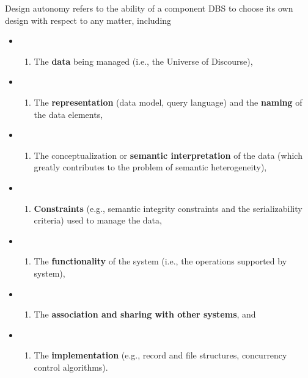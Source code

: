 \begin{leftbar}
Design autonomy refers to the ability of a component DBS to choose its
own design with respect to any matter, including

\begin{itemize}
\item
  \begin{enumerate}
  \def\labelenumi{(\alph{enumi})}
  
  \item
    The \textbf{data} being managed (i.e., the Universe of Discourse),
  \end{enumerate}
\item
  \begin{enumerate}
  \def\labelenumi{(\alph{enumi})}
  \setcounter{enumi}{1}
  
  \item
    The \textbf{representation} (data model, query language) and the
    \textbf{naming} of the data elements,
  \end{enumerate}
\item
  \begin{enumerate}
  \def\labelenumi{(\alph{enumi})}
  \setcounter{enumi}{2}
  
  \item
    The conceptualization or \textbf{semantic interpretation} of the
    data (which greatly contributes to the problem of semantic
    heterogeneity),
  \end{enumerate}
\item
  \begin{enumerate}
  \def\labelenumi{(\alph{enumi})}
  \setcounter{enumi}{3}
  
  \item
    \textbf{Constraints} (e.g., semantic integrity constraints and the
    serializability criteria) used to manage the data,
  \end{enumerate}
\item
  \begin{enumerate}
  \def\labelenumi{(\alph{enumi})}
  \setcounter{enumi}{4}
  
  \item
    The \textbf{functionality} of the system (i.e., the operations
    supported by system),
  \end{enumerate}
\item
  \begin{enumerate}
  \def\labelenumi{(\alph{enumi})}
  \setcounter{enumi}{5}
  
  \item
    The \textbf{association and sharing with other systems}, and
  \end{enumerate}
\item
  \begin{enumerate}
  \def\labelenumi{(\alph{enumi})}
  \setcounter{enumi}{6}
  
  \item
    The \textbf{implementation} (e.g., record and file structures,
    concurrency control algorithms).
  \end{enumerate}
\end{itemize}
\end{leftbar}

